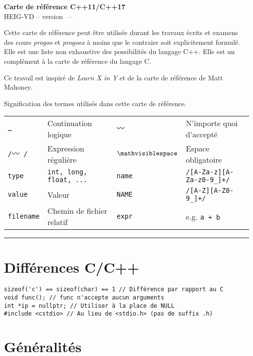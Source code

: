 \documentclass{article}
\newcommand{\etc}{\small \ldots}
\newcommand{\any}{$\hzigzag$~}
\newcommand{\spc}{$\mathvisiblespace$}
\newcommand{\cd}{\lstinline}
\begin{document}
\begin{multicols*}{3}

\begin{center}
  {\Large \bf Carte de référence C++11/C++17} \\
  HEIG-VD -- version \revision \ -- \revisiondate \\
\end{center}

Cette carte de référence peut être utilisée durant les travaux écrits et examens
des cours \emph{progoo} et \emph{progoox} à moins que le contraire soit explicitement formulé.
Elle est une liste non exhaustive des possibilités du langage C++. Elle est un complément à la carte
de référence du langage C.

Ce travail est inspiré de \emph{Learn X in Y} et de la carte de référence de Matt Mahoney.

Signification des termes utilisés dans cette carte de référence.

\begin{tabularx}{\linewidth}{
  >{\hsize=0.5\hsize}X%
  >{\hsize=1.5\hsize}X%
  >{\hsize=0.5\hsize}X%
  >{\hsize=1.5\hsize}X%
  }

  \tt \etc      & Continuation logique    & \tt \any    & N'importe quoi d'accepté \\
  \tt /\any/    & Expression régulière    & \tt \spc    & Espace obligatoire \\
  \cd{type}     & \tt int, long, float, ... & \cd{name} & \tt /[A-Za-z][A-Za-z0-9\_]+/ \\
  \cd{value}    & Valeur & \cd{NAME} & \tt /[A-Z][A-Z0-9\_]+/ \\
  \cd{filename} & Chemin de fichier relatif & \cd{expr}   & e.g. \tt a + b \\
\end{tabularx}
\hrule

\section*{Différences C/C++}
\begin{lstlisting}
sizeof('c') == sizeof(char) == 1 // Différence par rapport au C
void func(); // func n'accepte aucun arguments
int *ip = nullptr; // Utiliser à la place de NULL
#include <cstdio> // Au lieu de <stdio.h> (pas de suffix .h)
\end{lstlisting}

\section*{Généralités}


\end{multicols*}
\end{document}
